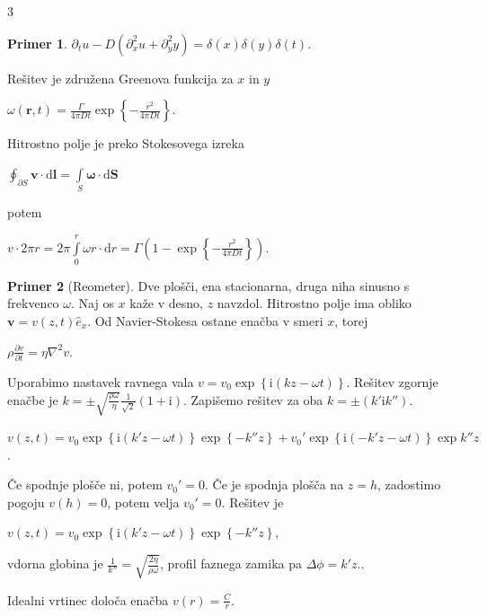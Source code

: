 \documentclass[10pt,landscape]{article}
\theoremstyle{definition}
\newtheorem*{primer}{Primer}
\begin{document}
\begin{multicols}{3}
\begin{primer}
    \( \partial_t u - D \left( \partial_x ^2 u + \partial_y ^2 y \right) = \delta(x) \delta(y) \delta(t) \).

    Rešitev je združena Greenova funkcija za \( x \) in \( y \)

    \( \omega(\mathbf{r}, t) = \frac{\Gamma}{4 \pi D t} \exp \left\{ - \frac{r ^2}{4 \pi D t} \right\} \). 

    Hitrostno polje je preko Stokesovega izreka

    \( \oint_{\partial S} \mathbf{v} \cdot \mathrm{d} \mathbf{l} = \int\limits_S^{} \bm{\omega} \cdot \mathrm{d} \mathbf{S} \)

    potem

    \( v \cdot 2 \pi r = 2 \pi \int\limits_0^r \omega r \cdot \mathrm{d} r = \Gamma \left( 1 - \exp \left\{ - \frac{r ^2}{4 \pi D t} \right\} \right) \).
    \end{primer}

    \begin{primer}[Reometer]
      Dve plošči, ena stacionarna, druga niha sinusno s frekvenco \( \omega \). Naj os \( x \) kaže v desno, \( z \) navzdol. Hitrostno polje ima obliko \( \mathbf{v} = v(z, t) \hat{e}_x \). Od Navier-Stokesa ostane enačba v smeri \( x \), torej

      \( \rho \frac{\partial v}{\partial t} = \eta \nabla ^2 v \).

      Uporabimo nastavek ravnega vala \( v = v_0 \exp \left\{ \mathrm{i} (kz - \omega t) \right\} \). Rešitev zgornje enačbe je \( k = \pm \sqrt{\frac{\rho \omega}{\eta}} \frac{1}{\sqrt{2}} (1 + \mathrm{i}) \).  Zapišemo rešitev za oba \( k = \pm (k'  \mathrm{i} k'') \).

      \( v(z, t) = v_0 \exp \left\{ \mathrm{i} (k' z - \omega t) \right\} \exp \left\{ - k'' z \right\} + v_0 ' \exp \left\{ \mathrm{i} (- k' z - \omega t) \right\} \exp{k'' z} \).

      Če spodnje plošče ni, potem \( v_0 ' = 0 \). Če je spodnja plošča na \( z = h \), zadostimo pogoju \( v(h) = 0 \), potem velja \( v_0' = 0 \). Rešitev je

      \( v(z, t) = v_0 \exp \left\{ \mathrm{i} (k' z - \omega t) \right\} \exp \left\{ - k'' z \right\} \),

      vdorna globina je \( \frac{1}{k''} = \sqrt{\frac{2 \eta}{\rho \omega}} \), profil faznega zamika pa \( \Delta \phi = k' z. \).
    \end{primer}

    Idealni vrtinec določa enačba \( v(r) = \frac{C}{r} \).


\end{multicols}
\end{document}
